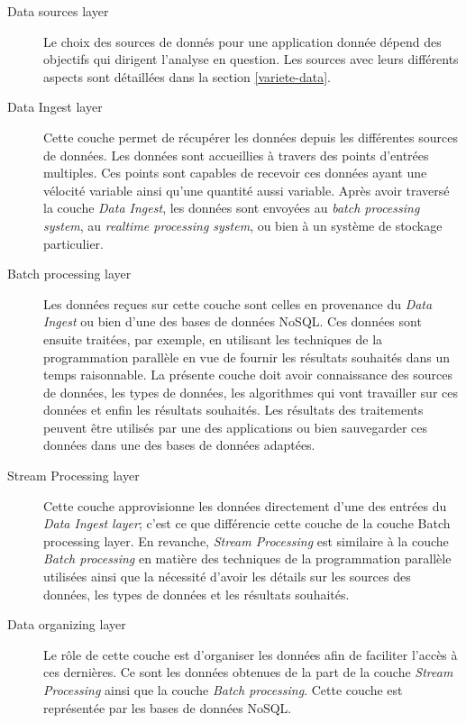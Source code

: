 		
		\begin{description}
			\item[Data sources layer] Le choix des sources de donnés pour une application donnée dépend des objectifs qui dirigent l'analyse en question. Les sources avec leurs différents aspects sont détaillées dans la section \ref{variete-data}.
		
			
		\item[Data Ingest layer] Cette couche permet de récupérer les données depuis les différentes sources de données. Les données sont accueillies à travers des points d'entrées multiples. Ces points  sont capables de recevoir  ces données ayant une vélocité variable ainsi qu'une quantité aussi variable.  Après avoir traversé  la couche \textit{Data Ingest}, les données sont envoyées au \textit{batch processing system}, au \textit{realtime processing system}, ou bien à un système de stockage particulier.
		
		\item[Batch processing layer] Les données reçues sur cette couche sont celles en provenance du \textit{Data Ingest} ou bien d'une des bases de données NoSQL. Ces données sont ensuite traitées, par exemple, en utilisant les techniques de la programmation parallèle en vue de fournir les résultats souhaités dans un temps raisonnable. La présente couche doit avoir connaissance des sources de données, les types de données, les algorithmes qui vont travailler sur ces données et enfin les résultats souhaités. Les résultats des traitements peuvent être utilisés par une des applications ou bien sauvegarder ces données dans une des bases de données adaptées.
		
		
		\item[Stream Processing layer] Cette couche approvisionne les données directement d'une des entrées du \textit{Data Ingest layer}; c'est ce que différencie cette couche de la couche Batch processing layer. En revanche, \textit{Stream Processing} est similaire à la couche   \textit{Batch processing} en matière  des techniques de la programmation parallèle utilisées ainsi que la nécessité d'avoir les détails sur les sources des données, les types de données et les résultats souhaités.
		
		
		\item[Data organizing layer] Le rôle de cette couche est d'organiser les données afin de faciliter l'accès à ces dernières. Ce sont les  données obtenues  de la part de la  couche  \textit{Stream Processing} ainsi que la couche \textit{Batch processing}. Cette couche est représentée par les bases de données NoSQL. 
		

\end{description}

